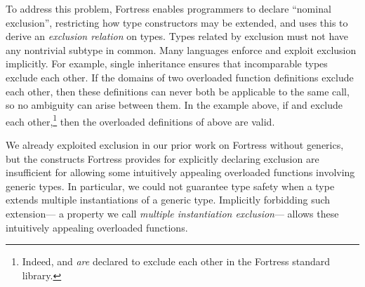 \documentclass[10pt]{sigplanconf}
\newcommand{\TODO}[1]{\textbf{\emph{\textcolor{red}{TODO}}}: \textsf{\footnotesize #1}}
\begin{document}
To address this problem,
Fortress enables programmers to declare ``nominal exclusion'', 
restricting how type constructors may be extended, 
and uses this to derive an \emph{exclusion relation} on types.
Types related by exclusion must not have any nontrivial subtype in common.
Many languages enforce and exploit exclusion implicitly. 
For example, single inheritance ensures that
incomparable types exclude each other. 
If the domains of two overloaded function definitions exclude each other, 
then these definitions can never both be applicable to the same call,
so no ambiguity can arise between them.
In the example above,
if  and  exclude each other,\!\footnote{
Indeed,  and  \emph{are} declared to exclude
each other in the Fortress standard library.}
then the overloaded definitions of  above are valid.

We already exploited exclusion 
in our prior work on Fortress without generics, 
but the constructs Fortress provides for explicitly declaring exclusion 
are insufficient for allowing 
some intuitively appealing overloaded functions involving generic types.
In particular, 
we could not guarantee type safety 
when a type extends multiple instantiations of a generic type.
Implicitly forbidding such extension---%
a property we call \emph{multiple instantiation exclusion}---%
allows these intuitively appealing overloaded functions.







\end{document}
